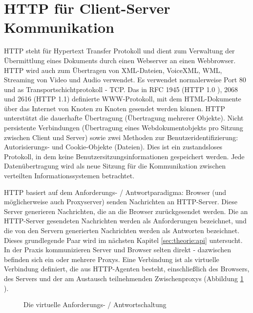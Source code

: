 \section{HTTP für Client-Server Kommunikation}
\label{sec:theorie:http}
HTTP steht für Hypertext Transfer Protokoll und dient zum Verwaltung der Übermittlung eines Dokuments durch einen Webserver an einen Webbrowser. HTTP wird auch zum Übertragen von XML-Dateien, VoiceXML, WML, Streaming von Video und Audio verwendet. Es verwendet normalerweise Port 80 und as Transportschichtprotokoll - TCP. Das in RFC 1945 (HTTP 1.0 \cite{website:httprfc1945}), 2068 \cite{website:httprfc2068} und 2616 (HTTP 1.1) definierte WWW-Protokoll, mit dem HTML-Dokumente über das Internet von Knoten zu Knoten gesendet werden können. HTTP unterstützt die dauerhafte Übertragung (Übertragung mehrerer Objekte). Nicht persistente Verbindungen (Übertragung eines Webdokumentobjekts pro Sitzung zwischen Client und Server) sowie zwei Methoden zur Benutzeridentifizierung: Autorisierungs- und Cookie-Objekte (Dateien). Dies ist ein zustandsloses Protokoll, in dem keine Benutzersitzungsinformationen gespeichert werden. Jede Datenübertragung wird als neue Sitzung für die Kommunikation zwischen verteilten Informationssystemen betrachtet. 

HTTP basiert auf dem Anforderungs- / Antwortparadigma: Browser (und möglicherweise auch Proxyserver) senden Nachrichten an HTTP-Server. Diese Server generieren Nachrichten, die an die Browser zurückgesendet werden. Die an HTTP-Server gesendeten Nachrichten werden als Anforderungen bezeichnet, und die von den Servern generierten Nachrichten werden als Antworten bezeichnet\cite[pp.33-34]{shklar:webapplication}. Dieses grundlegende Paar wird im nächsten Kapitel \ref{sec:theorie:api} untersucht. In der Praxis kommunizieren Server und Browser selten direkt - dazwischen befinden sich ein oder mehrere Proxys. Eine Verbindung ist als virtuelle Verbindung definiert, die aus HTTP-Agenten besteht, einschließlich des Browsers, des Servers und der am Austausch teilnehmenden Zwischenproxys (Abbildung \ref{fig:http_req} \cite[pp.33-34]{shklar:webapplication}).
\begin{figure}
	\centering
	\caption{Die virtuelle Anforderungs- / Antwortschaltung}
	\label{fig:http_req}
\end{figure}

